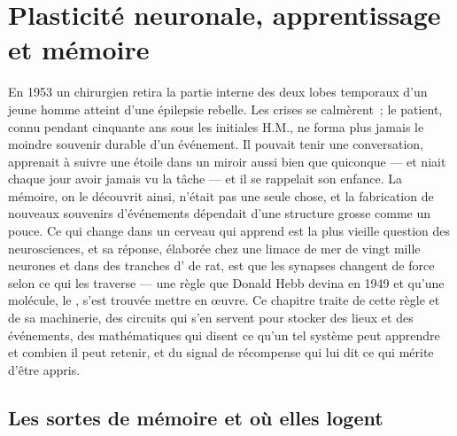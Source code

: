 \chapter{Plasticité neuronale, apprentissage et mémoire}\label{ch:b3:learning-memory}

En 1953 un chirurgien retira la partie interne des deux lobes temporaux
d'un jeune homme atteint d'une épilepsie rebelle. Les crises se
calmèrent~; le patient, connu pendant cinquante ans sous les initiales
H.M., ne forma plus jamais le moindre souvenir durable d'un événement.
Il pouvait tenir une conversation, apprenait à suivre une étoile dans un
miroir aussi bien que quiconque --- et niait chaque jour avoir jamais vu
la tâche --- et il se rappelait son enfance. La mémoire, on le découvrit
ainsi, n'était pas une seule chose, et la fabrication de nouveaux
souvenirs d'événements dépendait d'une structure grosse comme un pouce.
Ce qui change dans un cerveau qui apprend est la plus vieille question
des neurosciences, et sa réponse, élaborée chez une limace de mer de
vingt mille neurones et dans des tranches d' de rat, est que
les synapses changent de force selon ce qui les traverse --- une règle
que Donald Hebb devina en 1949 et qu'une molécule, le ,
s'est trouvée mettre en œuvre. Ce chapitre traite de cette règle et de
sa machinerie, des circuits qui s'en servent pour stocker des lieux et
des événements, des mathématiques qui disent ce qu'un tel système peut
apprendre et combien il peut retenir, et du signal de récompense qui lui
dit ce qui mérite d'être appris.

\section{Les sortes de mémoire et où elles logent}

